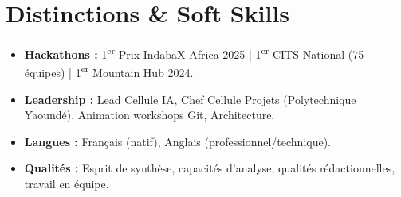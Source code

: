 \documentclass[a4paper,11pt]{article}
\begin{document}
\section{Distinctions \& Soft Skills}
\begin{itemize}[leftmargin=*, label=\tiny$\bullet$, nosep]
    \item \textbf{Hackathons :} 1\textsuperscript{er} Prix IndabaX Africa 2025 | 1\textsuperscript{er} CITS National (75 équipes) | 1\textsuperscript{er} Mountain Hub 2024.
    \item \textbf{Leadership :} Lead Cellule IA, Chef Cellule Projets (Polytechnique Yaoundé). Animation workshops Git, Architecture.
    \item \textbf{Langues :} Français (natif), Anglais (professionnel/technique).
    \item \textbf{Qualités :} Esprit de synthèse, capacités d'analyse, qualités rédactionnelles, travail en équipe.
\end{itemize}
\end{document}
